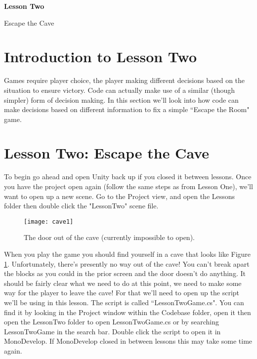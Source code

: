 \documentclass{article}
\begin{document}
\vspace*{\fill}
\begin{center}
{\Huge\bf Lesson Two}

\vspace{2\baselineskip}

{\huge Escape the Cave}
\end{center}
\vspace*{\fill}
\newpage


\section{Introduction to Lesson Two}

Games require player choice, the player making different decisions based on the situation to ensure victory. Code can actually make use of a similar (though simpler) form of decision making. In this section we'll look into how code can make decisions based on different information to fix a simple ``Escape the Room" game. 

\section{Lesson Two: Escape the Cave}

To begin go ahead and open Unity back up if you closed it between lessons. Once you have the project open again (follow the same steps as from Lesson One), we'll want to open up a new scene. Go to the Project view, and open the Lessons folder then double click the "LessonTwo" scene file.

\noindent{}

\begin{figure}
  \texttt{[image: cave1]}
  \caption{The door out of the cave (currently impossible to open).}
  \label{fig:cave1}
\end{figure}

When you play the game you should find yourself in a cave that looks like Figure \ref{fig:cave1}. Unfortunately, there's presently no way out of the cave! You can't break apart the blocks as you could in the prior screen and the door doesn't do anything. It should be fairly clear what we need to do at this point, we need to make some way for the player to leave the cave! For that we'll need to open up the script we'll be using in this lesson. The script is called ``LessonTwoGame.cs". You can find it by looking in the Project window within the Codebase folder, open it then open the LessonTwo folder to open LessonTwoGame.cs or by searching LessonTwoGame in the search bar. Double click the script to open it in MonoDevelop. If MonoDevelop closed in between lessons this may take some time again. 
\end{document}
